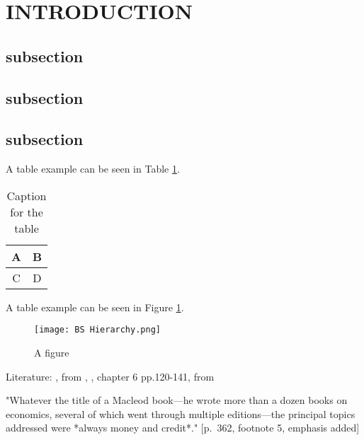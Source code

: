 \section{\MakeUppercase{Introduction}}

\subsection{subsection}

\subsection{subsection}

\subsection{subsection}

A table example can be seen in Table \ref{table-example}.\footnotemark{} 

\begin{table}[!ht]
\centering
\begin{tabular}{|c|c|}
    \hline
    A & B\\
    \hline
    C & D\\
    \hline
\end{tabular}
\caption{Caption for the table}
\label{table-example}
\end{table}

A table example can be seen in Figure \ref{fig-example}.
\begin{figure}[ht]
  \centering
  \texttt{[image: BS Hierarchy.png]}
  \caption{A figure}
  \label{fig-example}
\end{figure}


Literature: \cite{bezemer2010}, \cite{skaggs1997} from \cite{smithin1997}, \cite{skaggs2003}, \cite{maloney1991} chapter 6 pp.120-141, \cite{hayek1933} from \cite{socenc1933}

"Whatever the title of a Macleod book---he wrote more than a dozen books on economics, several of which went through multiple editions---the principal topics addressed were *always money and credit*." \cite{skaggs2003} [p.~362, footnote 5, emphasis added]
